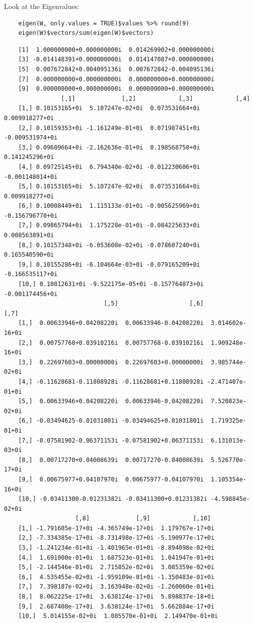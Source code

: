 \documentclass[11pt]{report}
\begin{document}
Look at the Eigenvalues:

\begin{tcolorbox}
    \begin{verbatim}
    eigen(W, only.values = TRUE)$values %>% round(9)
    eigen(W)$vectors/sum(eigen(W)$vectors)
    \end{verbatim}
\tcblower
    \begin{verbatim}
    [1]  1.000000000+0.000000000i  0.014269902+0.000000000i
    [3] -0.014148391+0.000000000i  0.014147087+0.000000000i
    [5]  0.007672842+0.004095136i  0.007672842-0.004095136i
    [7]  0.000000000+0.000000000i  0.000000000+0.000000000i
    [9]  0.000000000+0.000000000i  0.000000000+0.000000000i
                [,1]             [,2]            [,3]            [,4]
    [1,] 0.10153165+0i  5.107247e-02+0i  0.073531664+0i  0.009918277+0i
    [2,] 0.10159353+0i -1.161249e-01+0i  0.071987451+0i -0.009531974+0i
    [3,] 0.09609664+0i -2.162636e-01+0i  0.198568750+0i  0.141245296+0i
    [4,] 0.09725145+0i  6.794340e-02+0i -0.012230606+0i -0.001148014+0i
    [5,] 0.10153165+0i  5.107247e-02+0i  0.073531664+0i  0.009918277+0i
    [6,] 0.10008449+0i  1.115133e-01+0i -0.005625969+0i -0.156796770+0i
    [7,] 0.09865794+0i  1.175228e-01+0i -0.084225633+0i  0.008563891+0i
    [8,] 0.10157348+0i -6.053608e-02+0i -0.078607240+0i  0.165540590+0i
    [9,] 0.10155286+0i -6.104664e-03+0i -0.079165209+0i -0.166535117+0i
    [10,] 0.10012631+0i -9.522175e-05+0i -0.157764873+0i -0.001174456+0i
                            [,5]                    [,6]             [,7]
    [1,]  0.00633946+0.04208220i  0.00633946-0.04208220i  3.014602e-16+0i
    [2,]  0.00757768+0.03910216i  0.00757768-0.03910216i  1.909248e-16+0i
    [3,]  0.22697603+0.00000000i  0.22697603+0.00000000i  3.985744e-02+0i
    [4,] -0.11628681-0.11808928i -0.11628681+0.11808928i -2.471407e-01+0i
    [5,]  0.00633946+0.04208220i  0.00633946-0.04208220i  7.520823e-02+0i
    [6,] -0.03494625-0.01031801i -0.03494625+0.01031801i  1.719325e-01+0i
    [7,] -0.07581902-0.06371153i -0.07581902+0.06371153i  6.131013e-03+0i
    [8,]  0.00717270+0.04008639i  0.00717270-0.04008639i  5.526770e-17+0i
    [9,]  0.00675977+0.04107970i  0.00675977-0.04107970i  1.105354e-16+0i
    [10,] -0.03411300-0.01231382i -0.03411300+0.01231382i -4.598845e-02+0i
                    [,8]             [,9]            [,10]
    [1,] -1.791605e-17+0i -4.365749e-17+0i  1.179767e-17+0i
    [2,] -7.334385e-17+0i -8.731498e-17+0i -5.190977e-17+0i
    [3,] -1.241234e-01+0i -1.401965e-01+0i -8.894098e-02+0i
    [4,]  1.691000e-01+0i  1.687523e-01+0i  1.041947e-01+0i
    [5,] -2.144546e-01+0i  2.715852e-02+0i  3.085359e-02+0i
    [6,]  4.535455e-02+0i -1.959109e-01+0i -1.350483e-01+0i
    [7,]  7.398187e-02+0i  3.163948e-02+0i -1.260060e-01+0i
    [8,]  8.062225e-17+0i  3.638124e-17+0i  5.898837e-18+0i
    [9,]  2.687408e-17+0i  3.638124e-17+0i  5.662884e-17+0i
    [10,]  5.014155e-02+0i  1.085570e-01+0i  2.149470e-01+0i
    \end{verbatim}
\end{tcolorbox}
\end{document}
